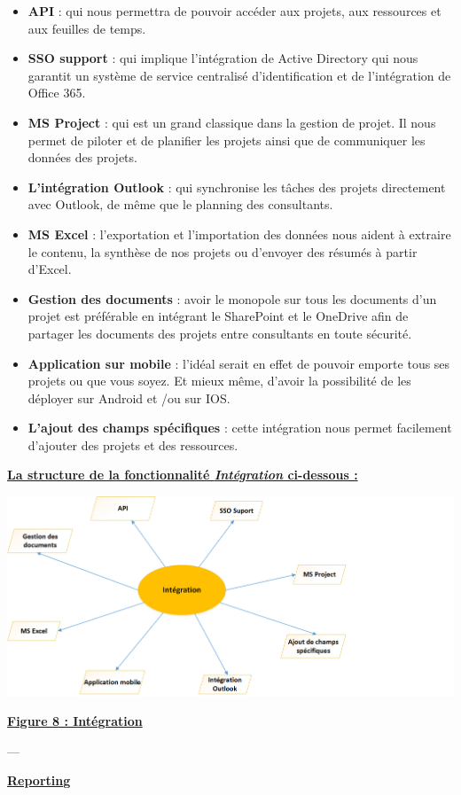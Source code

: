 \documentclass[11pt]{report}
\begin{document}
\begin{itemize}
	\item \textbf{API }: qui nous permettra de pouvoir accéder aux projets, aux ressources et aux feuilles de temps.

	\item \textbf{SSO support} : qui implique l’intégration de Active Directory qui nous garantit un système de service centralisé d’identification et de l’intégration de Office 365. 

	\item \textbf{MS Project} : qui est un grand classique dans la gestion de projet. Il nous permet de piloter et de planifier les projets ainsi que de communiquer les données des projets.

	\item \textbf{L’intégration Outlook} : qui synchronise les tâches des projets directement avec Outlook, de même que le planning des consultants. 

	\item \textbf{MS Excel} : l’exportation et l’importation des données nous aident à extraire le contenu, la synthèse de nos projets ou d’envoyer des résumés à partir d’Excel. 

	\item \textbf{Gestion des documents} : avoir le monopole sur tous les documents d’un projet est préférable en intégrant le SharePoint et le OneDrive afin de partager les documents des projets entre consultants en toute sécurité. 

	\item \textbf{Application sur mobile} : l’idéal serait en effet de pouvoir emporte tous ses projets ou que vous soyez. Et mieux même, d’avoir la possibilité de les déployer sur Android et /ou sur IOS.

	\item \textbf{L’ajout des champs spécifiques} : cette intégration nous permet facilement d’ajouter des projets et des ressources.
\end{itemize}

\newpage
\begin{center}
\underline{\textbf{La structure de la fonctionnalité \textit{Intégration} ci-dessous :}}
\end{center}
\begin{center}
\includegraphics[scale=0.7]{images/figure8.png} 
\quad

\underline{\textbf{Figure 8 : Intégration}}
\end{center}
\quad
---
\begin{center}
\underline{\textbf{Reporting}} 
\end{center}
\end{document}
